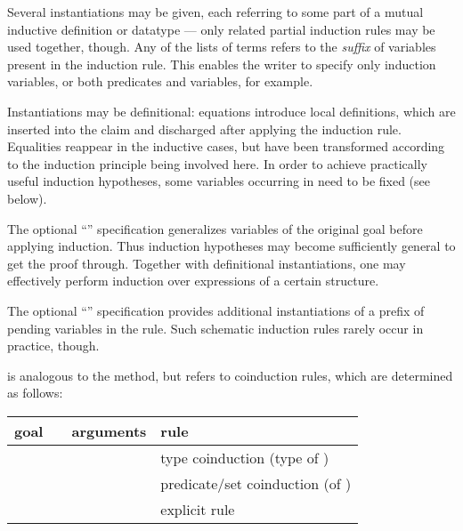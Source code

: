 \begin{isabellebody}
\begin{isamarkuptext}
\begin{descr}
  Several instantiations may be given, each referring to some part of
  a mutual inductive definition or datatype --- only related partial
  induction rules may be used together, though.  Any of the lists of
  terms  refers to the \emph{suffix} of variables
  present in the induction rule.  This enables the writer to specify
  only induction variables, or both predicates and variables, for
  example.
  
  Instantiations may be definitional: equations 
  introduce local definitions, which are inserted into the claim and
  discharged after applying the induction rule.  Equalities reappear
  in the inductive cases, but have been transformed according to the
  induction principle being involved here.  In order to achieve
  practically useful induction hypotheses, some variables occurring in
   need to be fixed (see below).
  
  The optional ``''
  specification generalizes variables  of the original goal before applying induction.  Thus
  induction hypotheses may become sufficiently general to get the
  proof through.  Together with definitional instantiations, one may
  effectively perform induction over expressions of a certain
  structure.
  
  The optional ``''
  specification provides additional instantiations of a prefix of
  pending variables in the rule.  Such schematic induction rules
  rarely occur in practice, though.

  \item [\mbox{\isa{coinduct}}~\isa{{\isachardoublequote}inst\ R{\isachardoublequote}}] is analogous to the
  \mbox{} method, but refers to coinduction rules, which are
  determined as follows:

  \medskip
  \begin{tabular}{llll}
    goal          &                    & arguments & rule \\\hline
                  & \mbox{\isa{coinduct}} & \isa{x} & type coinduction (type of \isa{x}) \\
    \isa{{\isachardoublequote}A\ x{\isachardoublequote}} & \mbox{\isa{coinduct}} & \isa{{\isachardoublequote}{\isasymdots}{\isachardoublequote}} & predicate/set coinduction (of \isa{A}) \\
    \isa{{\isachardoublequote}{\isasymdots}{\isachardoublequote}}   & \mbox{\isa{coinduct}} & \isa{{\isachardoublequote}{\isasymdots}\ rule{\isacharcolon}\ R{\isachardoublequote}} & explicit rule \isa{R} \\
  \end{tabular}
  

\end{descr}
\end{isamarkuptext}
\end{isabellebody}

